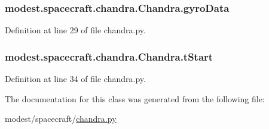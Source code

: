 \subsubsection[{\texorpdfstring{gyro\+Data}{gyroData}}]{\setlength{\rightskip}{0pt plus 5cm}modest.\+spacecraft.\+chandra.\+Chandra.\+gyro\+Data}\hypertarget{classmodest_1_1spacecraft_1_1chandra_1_1Chandra_a36ed104ae479e208b38458de53ed5d02}{}\label{classmodest_1_1spacecraft_1_1chandra_1_1Chandra_a36ed104ae479e208b38458de53ed5d02}


Definition at line 29 of file chandra.\+py.

\subsubsection[{\texorpdfstring{t\+Start}{tStart}}]{\setlength{\rightskip}{0pt plus 5cm}modest.\+spacecraft.\+chandra.\+Chandra.\+t\+Start}\hypertarget{classmodest_1_1spacecraft_1_1chandra_1_1Chandra_aacf53cc2a851ca6597e8fcbca16b2b9a}{}\label{classmodest_1_1spacecraft_1_1chandra_1_1Chandra_aacf53cc2a851ca6597e8fcbca16b2b9a}


Definition at line 34 of file chandra.\+py.



The documentation for this class was generated from the following file\+:\begin{DoxyCompactItemize}
\item 
modest/spacecraft/\hyperlink{chandra_8py}{chandra.\+py}\end{DoxyCompactItemize}
